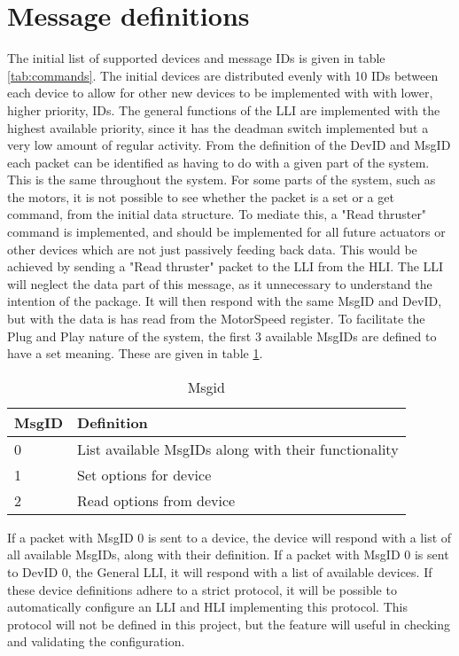 \section{Message definitions}
The initial list of supported devices and message IDs is given in table \ref{tab:commands}. The initial devices are distributed evenly with 10 IDs between each device to allow for other new devices to be implemented with with lower, higher priority, IDs. The general functions of the LLI are implemented with the highest available priority, since it has the deadman switch implemented but a very low amount of regular activity.
From the definition of the DevID and MsgID each packet can be identified as having to do with a given part of the system. This is the same throughout the system. For some parts of the system, such as the motors, it is not possible to see whether the packet is a set or a get command, from the initial data structure. To mediate this, a "Read thruster" command is implemented, and should be implemented for all future actuators or other devices which are not just passively feeding back data. This would be achieved by sending a "Read thruster" packet to the LLI from the HLI. The LLI will neglect the data part of this message, as it unnecessary to understand the intention of the package. It will then respond with the same MsgID and  DevID, but with the data is has read from the MotorSpeed register.
To facilitate the Plug and Play nature of the system, the first 3 available MsgIDs are defined to have a set meaning. These are given in table \ref{tab:firstmsgids}.
\begin{table}[h]
\centering
\begin{tabular}{ll}
\toprule
\textbf{MsgID} & \textbf{Definition}\\
\midrule
0 & List available MsgIDs along with their functionality\\
1 & Set options for device\\
2 & Read options from device\\
\bottomrule
\end{tabular}
\caption{Msgid}
\label{tab:firstmsgids}
\end{table}
If a packet with MsgID 0 is sent to a device, the device will respond with a list of all available MsgIDs, along with their definition. If a packet with MsgID 0 is sent to DevID 0, the General LLI, it will respond with a list of available devices. If these device definitions adhere to a strict protocol, it will be possible to automatically configure an LLI and HLI implementing this protocol. This protocol will not be defined in this project, but the feature will useful in checking and validating the configuration.

